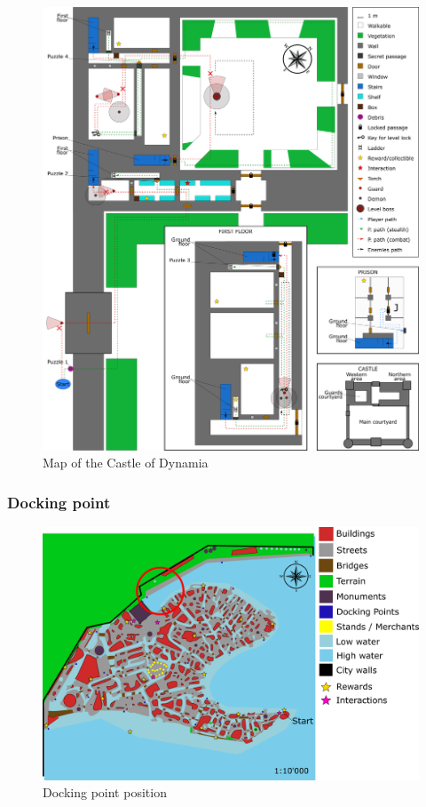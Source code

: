 \begin{figure}[H]
  \centering
  \includegraphics[width=\textwidth]{Images/Maps/castleOfDynamia}
  \caption{Map of the Castle of Dynamia}
\end{figure}

\subsubsection{Docking point}
\begin{figure}[H]
  \centering
  \includegraphics[width=12cm]{Images/Maps/dynamia_dockingPoint}
  \caption{Docking point position}
\end{figure}
  
